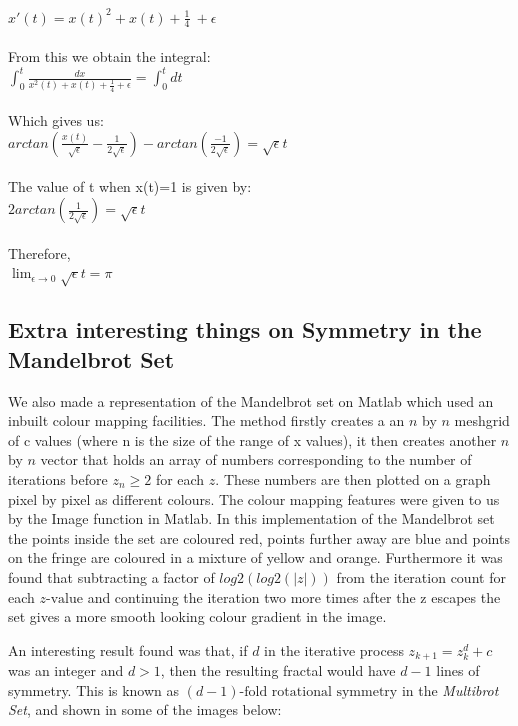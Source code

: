 \documentclass[a4wide, 10pt]{article}
\begin{document}
\\$x'(t) = x(t)^2 + x(t) + \frac{1}{4}\ + \epsilon$\\
\\From this we obtain the integral:
\\$\int_{0}^{t} \frac{dx}{x^2(t) + x(t) + \frac{1}{4} + \epsilon } = \int_{0}^{t} dt $\\
\\Which gives us:
\\ $arctan(\frac{x(t)}{\sqrt{\epsilon}} - \frac{1}{2\sqrt{\epsilon}}) - arctan(\frac{-1}{2\sqrt{\epsilon}}) = \sqrt{\epsilon} t $\\
\\The value of t when x(t)=1 is given by:
\\$2arctan(\frac{1}{2\sqrt{\epsilon}}) = \sqrt{\epsilon} t $\\
\\Therefore,
\\$\lim_{\epsilon \to 0} \sqrt{\epsilon} t = \pi $


\subsection{Extra interesting things on Symmetry in the Mandelbrot Set}

We also made a representation of the Mandelbrot set on Matlab which used an inbuilt colour 
 mapping facilities. The method firstly creates a an $n$ by $n$ meshgrid of c values (where 
  n is the size of the range of x values), it then creates another $n$ by $n$ vector that holds 
   an array of numbers corresponding to the number of iterations before $z_{n} \geq 2$ for 
    each $z$. These numbers are then plotted on a graph pixel by pixel as different colours. 
     The colour mapping features were given to us by the Image function in Matlab. In this 
      implementation of the Mandelbrot set the points inside the set are coloured red, points further
       away are blue and points on the fringe are coloured in a mixture of yellow and orange.
        Furthermore it was found that subtracting a factor of $log2(log2(|z|))$ from the iteration
         count for each $z \textrm{-value}$ and continuing the iteration two more times after the z
          escapes the set gives a more smooth looking colour gradient in the image.
      
An interesting result found was that, if $d$ in the iterative process $z_{k+1} = z_{k}^{d}
 + c$  was an integer and $d > 1$, then the resulting fractal would have $d - 1$ lines of
  symmetry. This is known as $(d-1) \textrm{-fold rotational symmetry}$ in the \emph{Multibrot Set},
   and shown in some of the images below:
\end{document}
